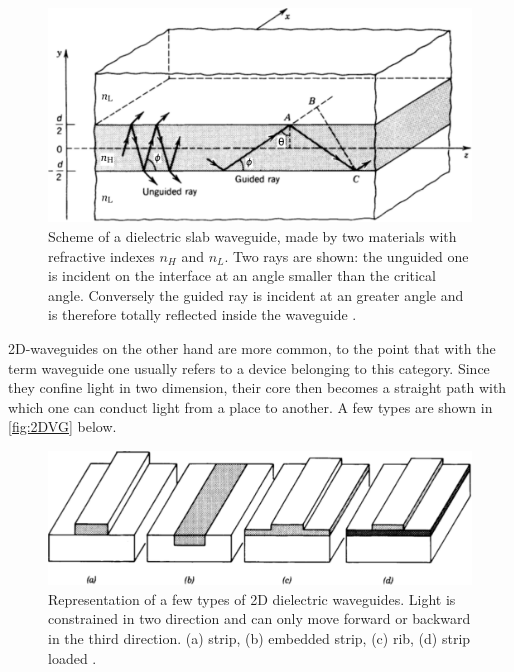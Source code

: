 \begin{figure}[ht]
	\centering
	\includegraphics[scale=.4]{figures/dielBC.pdf}
	\caption{Scheme of a dielectric slab waveguide, made by two materials with refractive indexes $n_H$ and $n_L$.
		Two rays are shown: the unguided one is incident on the interface at an angle smaller than the critical angle.
		Conversely the guided ray is incident at an greater angle and is therefore totally reflected inside the waveguide \cite{Saleh1991}.}
	\label{fig:slabVG}
\end{figure}

2D-waveguides on the other hand are more common, to the point that with the term waveguide one usually refers to a device belonging to this category.
Since they confine light in two dimension, their core then becomes a straight path with which one can conduct light from a place to another.
A few types are shown in \autoref{fig:2DVG} below.

\begin{figure}[ht]
	\centering
	\includegraphics[scale=.4]{figures/WGtypes.pdf}
	\caption{Representation of a few types of 2D dielectric waveguides.
		Light is constrained in two direction and can only move forward or backward in the third direction.
		(a) strip, (b) embedded strip, (c) rib, (d) strip loaded \cite{Saleh1991}.
		}
	\label{fig:2DVG}
\end{figure}


